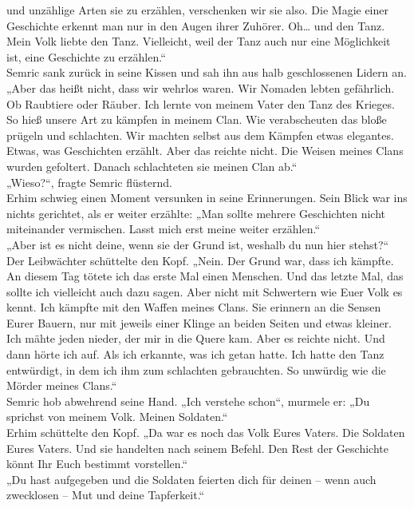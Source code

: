 und unzählige Arten sie zu erzählen, verschenken wir sie also. Die Magie einer Geschichte erkennt 
man nur in den Augen ihrer Zuhörer. Oh… und den Tanz. Mein Volk liebte den Tanz. Vielleicht, weil 
der Tanz auch nur eine Möglichkeit ist, eine Geschichte zu erzählen.“\\
Semric sank zurück in seine Kissen und sah ihn aus halb geschlossenen Lidern an. \\
„Aber das heißt nicht, dass wir wehrlos waren. Wir Nomaden lebten gefährlich. Ob Raubtiere oder 
Räuber. Ich lernte von meinem Vater den Tanz des Krieges. So hieß unsere Art zu kämpfen in meinem 
Clan. Wie verabscheuten das bloße prügeln und schlachten. Wir machten selbst aus dem Kämpfen etwas 
elegantes. Etwas, was Geschichten erzählt. Aber das reichte nicht. Die Weisen meines Clans wurden 
gefoltert. Danach schlachteten sie meinen Clan ab.“\\
„Wieso?“, fragte Semric flüsternd.\\
Erhim schwieg einen Moment versunken in seine Erinnerungen. Sein Blick war ins nichts gerichtet, als 
er weiter erzählte: „Man sollte mehrere Geschichten nicht miteinander vermischen. Lasst mich erst 
meine weiter erzählen.“\\
„Aber ist es nicht deine, wenn sie der Grund ist, weshalb du nun hier stehst?“\\
Der Leibwächter schüttelte den Kopf. „Nein. Der Grund war, dass ich kämpfte. An diesem Tag tötete 
ich das erste Mal einen Menschen. Und das letzte Mal, das sollte ich vielleicht auch dazu sagen. 
Aber nicht mit Schwertern wie Euer Volk es kennt. Ich kämpfte mit den Waffen meines Clans. Sie 
erinnern an die Sensen Eurer Bauern, nur mit jeweils einer Klinge an beiden Seiten und etwas 
kleiner. Ich mähte jeden nieder, der mir in die Quere kam. Aber es reichte nicht. Und dann hörte ich 
auf. Als ich erkannte, was ich getan hatte. Ich hatte den Tanz entwürdigt, in dem ich ihm zum 
schlachten gebrauchten. So unwürdig wie die Mörder meines Clans.“\\
Semric hob abwehrend seine Hand. „Ich verstehe schon“, murmele er: „Du sprichst von meinem Volk. 
Meinen Soldaten.“\\
Erhim schüttelte den Kopf. „Da war es noch das Volk Eures Vaters. Die Soldaten Eures Vaters. Und sie 
handelten nach seinem Befehl. Den Rest der Geschichte könnt Ihr Euch bestimmt vorstellen.“\\
„Du hast aufgegeben und die Soldaten feierten dich für deinen – wenn auch zwecklosen – Mut und deine 
Tapferkeit.“\\
